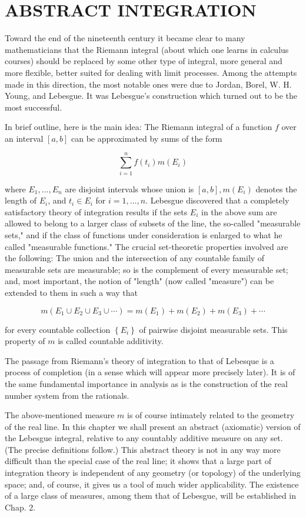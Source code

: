 \documentclass[10pt]{article}
\begin{document}
\section{ABSTRACT INTEGRATION}
Toward the end of the nineteenth century it became clear to many mathematicians that the Riemann integral (about which one learns in calculus courses) should be replaced by some other type of integral, more general and more flexible, better suited for dealing with limit processes. Among the attempts made in this direction, the most notable ones were due to Jordan, Borel, W. H. Young, and Lebesgue. It was Lebesgue's construction which turned out to be the most successful.

In brief outline, here is the main idea: The Riemann integral of a function $f$ over an interval $[a, b]$ can be approximated by sums of the form

$$
\sum_{i=1}^{n} f\left(t_{i}\right) m\left(E_{i}\right)
$$

where $E_{1}, \ldots, E_{n}$ are disjoint intervals whose union is $[a, b], m\left(E_{i}\right)$ denotes the length of $E_{i}$, and $t_{i} \in E_{i}$ for $i=1, \ldots, n$. Lebesgue discovered that a completely satisfactory theory of integration results if the sets $E_{i}$ in the above sum are allowed to belong to a larger class of subsets of the line, the so-called "measurable sets," and if the class of functions under consideration is enlarged to what he called "measurable functions." The crucial set-theoretic properties involved are the following: The union and the intersection of any countable family of measurable sets are measurable; so is the complement of every measurable set; and, most important, the notion of "length" (now called "measure") can be extended to them in such a way that

$$
m\left(E_{1} \cup E_{2} \cup E_{3} \cup \cdots\right)=m\left(E_{1}\right)+m\left(E_{2}\right)+m\left(E_{3}\right)+\cdots
$$

for every countable collection $\left\{E_{i}\right\}$ of pairwise disjoint measurable sets. This property of $m$ is called countable additivity.

The passage from Riemann's theory of integration to that of Lebesque is a process of completion (in a sense which will appear more precisely later). It is of the same fundamental importance in analysis as is the construction of the real number system from the rationals.

The above-mentioned measure $m$ is of course intimately related to the geometry of the real line. In this chapter we shall present an abstract (axiomatic) version of the Lebesgue integral, relative to any countably additive measure on any set. (The precise definitions follow.) This abstract theory is not in any way more difficult than the special case of the real line; it shows that a large part of integration theory is independent of any geometry (or topology) of the underlying space; and, of course, it gives us a tool of much wider applicability. The existence of a large class of measures, among them that of Lebesgue, will be established in Chap. 2.
\end{document}
